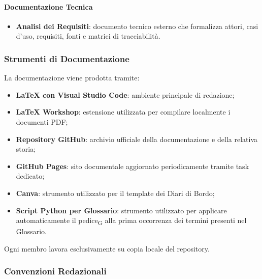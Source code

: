 \paragraph{Documentazione Tecnica}

\begin{itemize}
    \item \textbf{Analisi dei Requisiti}: documento tecnico esterno che formalizza
    attori, casi d'uso, requisiti, fonti e matrici di tracciabilità.
\end{itemize}


\subsubsection{Strumenti di Documentazione}
\label{sec:strumenti-doc}

La documentazione viene prodotta tramite:

\begin{itemize}
    \item \textbf{\LaTeX{} con Visual Studio Code}: ambiente principale di redazione;

    \item \textbf{LaTeX Workshop}: estensione utilizzata per compilare localmente i
    documenti PDF;

    \item \textbf{Repository GitHub}: archivio ufficiale della documentazione e della
    relativa storia;

    \item \textbf{GitHub Pages}: sito documentale aggiornato periodicamente tramite
    task dedicato;

    \item \textbf{Canva}: strumento utilizzato per il template dei Diari di Bordo;

    \item \textbf{Script Python per Glossario}: strumento utilizzato per applicare
    automaticamente il pedice\textsubscript{G} alla prima occorrenza dei termini
    presenti nel Glossario.
\end{itemize}

Ogni membro lavora esclusivamente su copia locale del repository.


\subsubsection{Convenzioni Redazionali}
\label{sec:convenzioni}

